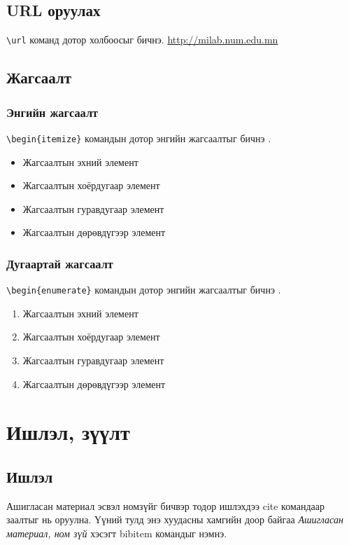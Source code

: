 \documentclass[12pt,A4]{report}
\begin{document}
\section{URL оруулах}
\texttt{\textbackslash url} команд дотор холбоосыг бичнэ. \url{http://milab.num.edu.mn}


\section{Жагсаалт}
\subsection{Энгийн жагсаалт}
\texttt{\textbackslash begin\{itemize\}} командын дотор энгийн жагсаалтыг бичнэ \cite{list}.
\begin{itemize}
	\item Жагсаалтын эхний элемент
	\item Жагсаалтын хоёрдугаар элемент
	\item Жагсаалтын гуравдугаар элемент
	\item Жагсаалтын дөрөвдүгээр элемент
\end{itemize}

\subsection{Дугаартай жагсаалт}
\texttt{\textbackslash begin\{enumerate\}} командын дотор энгийн жагсаалтыг бичнэ \cite{list}.
\begin{enumerate}
	\item Жагсаалтын эхний элемент
	\item Жагсаалтын хоёрдугаар элемент
	\item Жагсаалтын гуравдугаар элемент
	\item Жагсаалтын дөрөвдүгээр элемент
\end{enumerate}


\chapter{Ишлэл, зүүлт}
\section{Ишлэл}
Ашигласан материал эсвэл номзүйг бичвэр тодор ишлэхдээ cite командаар заалтыг нь оруулна.
Үүний тулд энэ хуудасны хамгийн доор байгаа \textit{Ашигласан материал, ном зүй} хэсэгт
bibitem командыг нэмнэ. \\
\end{document}
